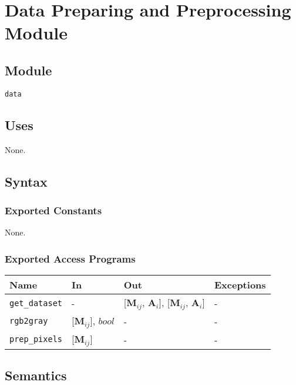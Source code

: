 \documentclass[12pt, titlepage]{article}
\def\code#1{\texttt{#1}}
\begin{document}
\section{Data Preparing and Preprocessing Module} \label{Data} 

\subsection{Module}
\code{data} 

\subsection{Uses}
None.

\subsection{Syntax}
\subsubsection{Exported Constants}
None.

\subsubsection{Exported Access Programs}

\begin{center}
\begin{tabular}{p{3.5cm} p{4cm} p{6cm} p{2cm}}
\hline
\textbf{Name} & \textbf{In} & \textbf{Out} & \textbf{Exceptions} \\
\hline
\code{get\_dataset} & - & [$\mathbf{M}_{ij}$, $\mathbf{A}_{i}$], [$\mathbf{M}_{ij}$, $\mathbf{A}_{i}$] & - \\
\code{rgb2gray} & [$\mathbf{M}_{ij}$], $bool$ & - & -\\
\code{prep\_pixels} & [$\mathbf{M}_{ij}$] & - & -\\
\hline
\end{tabular}
\end{center}

\subsection{Semantics}
\end{document}
